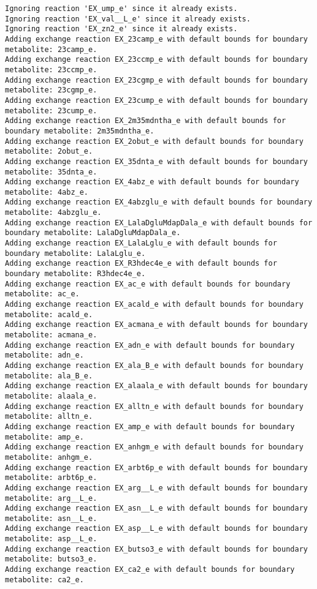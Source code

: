 \documentclass[
  letterpaper,
  DIV=11,
  numbers=noendperiod]{scrartcl}
\begin{document}
\begin{verbatim}
Ignoring reaction 'EX_ump_e' since it already exists.
Ignoring reaction 'EX_val__L_e' since it already exists.
Ignoring reaction 'EX_zn2_e' since it already exists.
Adding exchange reaction EX_23camp_e with default bounds for boundary metabolite: 23camp_e.
Adding exchange reaction EX_23ccmp_e with default bounds for boundary metabolite: 23ccmp_e.
Adding exchange reaction EX_23cgmp_e with default bounds for boundary metabolite: 23cgmp_e.
Adding exchange reaction EX_23cump_e with default bounds for boundary metabolite: 23cump_e.
Adding exchange reaction EX_2m35mdntha_e with default bounds for boundary metabolite: 2m35mdntha_e.
Adding exchange reaction EX_2obut_e with default bounds for boundary metabolite: 2obut_e.
Adding exchange reaction EX_35dnta_e with default bounds for boundary metabolite: 35dnta_e.
Adding exchange reaction EX_4abz_e with default bounds for boundary metabolite: 4abz_e.
Adding exchange reaction EX_4abzglu_e with default bounds for boundary metabolite: 4abzglu_e.
Adding exchange reaction EX_LalaDgluMdapDala_e with default bounds for boundary metabolite: LalaDgluMdapDala_e.
Adding exchange reaction EX_LalaLglu_e with default bounds for boundary metabolite: LalaLglu_e.
Adding exchange reaction EX_R3hdec4e_e with default bounds for boundary metabolite: R3hdec4e_e.
Adding exchange reaction EX_ac_e with default bounds for boundary metabolite: ac_e.
Adding exchange reaction EX_acald_e with default bounds for boundary metabolite: acald_e.
Adding exchange reaction EX_acmana_e with default bounds for boundary metabolite: acmana_e.
Adding exchange reaction EX_adn_e with default bounds for boundary metabolite: adn_e.
Adding exchange reaction EX_ala_B_e with default bounds for boundary metabolite: ala_B_e.
Adding exchange reaction EX_alaala_e with default bounds for boundary metabolite: alaala_e.
Adding exchange reaction EX_alltn_e with default bounds for boundary metabolite: alltn_e.
Adding exchange reaction EX_amp_e with default bounds for boundary metabolite: amp_e.
Adding exchange reaction EX_anhgm_e with default bounds for boundary metabolite: anhgm_e.
Adding exchange reaction EX_arbt6p_e with default bounds for boundary metabolite: arbt6p_e.
Adding exchange reaction EX_arg__L_e with default bounds for boundary metabolite: arg__L_e.
Adding exchange reaction EX_asn__L_e with default bounds for boundary metabolite: asn__L_e.
Adding exchange reaction EX_asp__L_e with default bounds for boundary metabolite: asp__L_e.
Adding exchange reaction EX_butso3_e with default bounds for boundary metabolite: butso3_e.
Adding exchange reaction EX_ca2_e with default bounds for boundary metabolite: ca2_e.

\end{verbatim}
\end{document}
